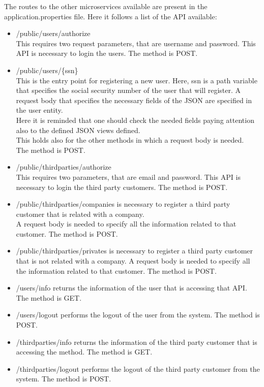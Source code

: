 The routes to the other microservices available are present in the application.properties file.
Here it follows a list of the API available:
\begin{itemize}

\item /public/users/authorize \\
This requires two request parameters, that are username and password. This API is necessary to login the users.
The method is POST.

\item /public/users/\{ssn\} \\
This is the entry point for registering a new user. Here, ssn is a path variable that specifies the social security number
of the user that will register. A request body that specifies the necessary fields of the JSON are specified in the user entity. \\
Here it is reminded that one should check the needed fields paying attention also to the defined JSON views defined. \\
This holds also for the other methods in which a request body is needed. \\
The method is POST.


\item /public/thirdparties/authorize \\
This requires two parameters, that are email and password. This API is necessary to login the third party customers. 
The method is POST.

\item /public/thirdparties/companies is necessary to register a third party customer that is related with a company. \\
A request body is needed to specify all the information related to that customer. The method is POST.

\item /public/thirdparties/privates is necessary to register a third party customer that is not related with a company.
A request body is needed to specify all the information related to that customer. The method is POST.

\item /users/info returns the information of the user that is accessing that API. The method is GET.

\item /users/logout performs the logout of the user from the system. The method is POST.

\item /thirdparties/info returns the information of the third party customer that is accessing the method. The method is GET.

\item /thirdparties/logout performs the logout of the third party customer from the system. The method is POST.

\end{itemize}


